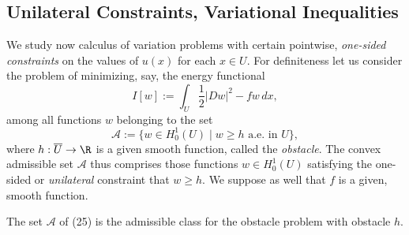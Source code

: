 \subsection{Unilateral Constraints, Variational Inequalities}
\label{sec:unilateral-constraints-variational-inequalities}

We study now calculus of variation problems with certain pointwise, \textit{one-sided constraints} on the values of $u(x)$ for each $x \in U$. For definiteness let us consider the problem of minimizing, say, the energy functional
\[
I[w] := \int_U \frac{1}{2}|Dw|^2 - fw\, dx,
\tag{24}
\]
among all functions $w$ belonging to the set
\[
\mathcal{A} := \{w \in H^1_0(U) \mid w \geq h \text{ a.e. in } U\},
\tag{25}
\]
where $h : \overline{U} \to \R$ is a given smooth function, called the \textit{obstacle}. The convex admissible set $\mathcal{A}$ thus comprises those functions $w \in H^1_0(U)$ satisfying the one-sided or \textit{unilateral} constraint that $w \geq h$. We suppose as well that $f$ is a given, smooth function.

\begin{definition}
\label{def:admissible-class-obstacle-problem}
The set $\mathcal{A}$ of (25) is the admissible class for the obstacle problem with obstacle $h$.
\end{definition}

